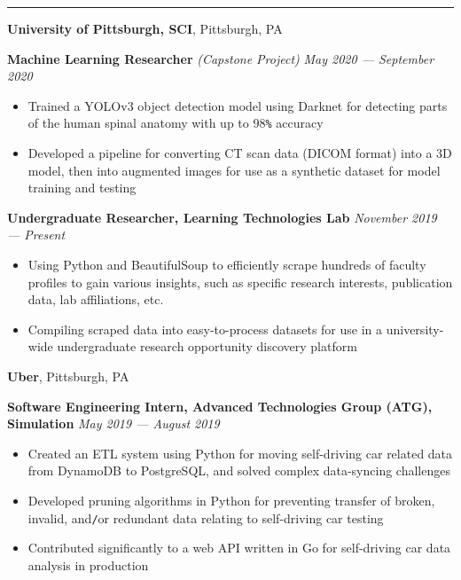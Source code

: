 \documentclass[10pt]{article}
\begin{document}
\begin{flushleft}
		\hrule

		\vspace{2.25mm}
		\textbf{University of Pittsburgh, SCI}, Pittsburgh, PA\\
		\begin{leftli}
         {\small \textbf{Machine Learning Researcher} \textit{(Capstone Project)}}  \hfill \textit{\small May 2020 --- September 2020}
			\begin{itemize}
				\item Trained a YOLOv3 object detection model using Darknet for detecting parts of the human spinal anatomy with up to 98\verb!%! accuracy
				\vspace{-2mm}
				\item Developed a pipeline for converting CT scan data (DICOM format) into a 3D model, then into augmented images for use as a synthetic dataset for model training and testing
			\end{itemize}
		\end{leftli}

		\begin{leftli}
			{\small \textbf{Undergraduate Researcher, Learning Technologies Lab}} \hfill \textit{\small November 2019 --- Present}
			\begin{itemize}
				\item Using Python and BeautifulSoup to efficiently scrape hundreds of faculty profiles to gain various insights, such as specific research interests, publication data, lab affiliations, etc.
				\vspace{-2mm}
				\item Compiling scraped data into easy-to-process datasets for use in a university-wide undergraduate research opportunity discovery platform
			\end{itemize}
		\end{leftli}

		\vspace{-1.50mm}
		\textbf{Uber}, Pittsburgh, PA\\
		\begin{leftli}
			{\small \textbf{Software Engineering Intern, Advanced Technologies Group (ATG), Simulation}} \hfill \textit{\small May 2019 --- August 2019}
			\begin{itemize}
				\item Created an ETL system using Python for moving self-driving car related data from DynamoDB to PostgreSQL, and solved complex data-syncing challenges
				\vspace{-2mm}
				\item Developed pruning algorithms in Python for preventing transfer of broken, invalid, and\texttt{/}or redundant data relating to self-driving car testing
				\vspace{-2mm}
				\item Contributed significantly to a web API written in Go for self-driving car data analysis in production
			\end{itemize}
		\end{leftli}


\end{flushleft}
\end{document}
